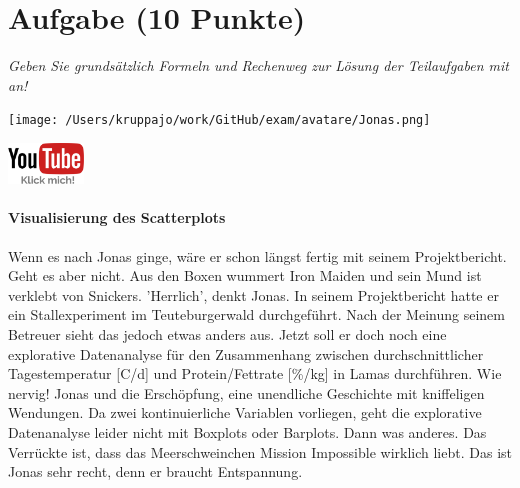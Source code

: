 \documentclass[a4paper, 9pt]{scrartcl}\usepackage[]{graphicx}\usepackage[]{xcolor}
\begin{document}
 
\clearpage

\section{Aufgabe \hfill (10 Punkte)}

\textit{Geben Sie grundsätzlich Formeln und Rechenweg zur Lösung der Teilaufgaben mit an!} \\[1Ex]
 

 
\begin{minipage}[t]{0.5\textwidth}
\texttt{[image: /Users/kruppajo/work/GitHub/exam/avatare/Jonas.png]}
\end{minipage}
\begin{minipage}[t]{0.5\textwidth}
\hfill
\href{https://youtu.be/VAqiUdV4WQ0}{\includegraphics[width = 2cm]{img/youtube}}
\end{minipage}
\vspace{-3ex}




\paragraph{Visualisierung des Scatterplots}

Wenn es nach Jonas ginge, wäre er schon längst fertig mit seinem Projektbericht. Geht es aber nicht. Aus den Boxen wummert Iron Maiden und sein Mund ist verklebt von Snickers. 'Herrlich', denkt Jonas. In seinem Projektbericht hatte er ein Stallexperiment im Teuteburgerwald durchgeführt. Nach der Meinung seinem Betreuer sieht das jedoch etwas anders aus. Jetzt soll er doch noch eine explorative Datenanalyse für den Zusammenhang zwischen durchschnittlicher Tagestemperatur [C/d] und Protein/Fettrate [\%/kg] in Lamas durchführen. Wie nervig! Jonas und die Erschöpfung, eine unendliche Geschichte mit kniffeligen Wendungen. Da zwei kontinuierliche Variablen vorliegen, geht die explorative Datenanalyse leider nicht mit Boxplots oder Barplots. Dann was anderes. Das Verrückte ist, dass das Meerschweinchen Mission Impossible wirklich liebt. Das ist Jonas sehr recht, denn er braucht Entspannung.
\end{document}
